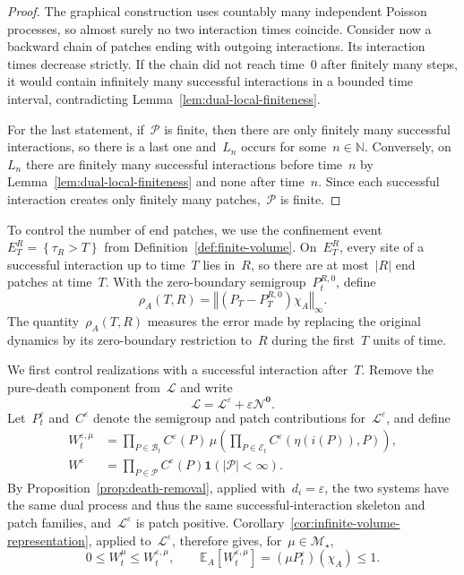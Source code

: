 \documentclass[EJP,preprint,NODS,nobera]{ejpecp}
\newcommand{\N}{\mathbb{N}}
\newcommand{\E}{\mathbb{E}}
\newcommand{\bb}[1]{\left(#1\right)}
\newcommand{\Cb}[1]{\left[#1\right]}
\newcommand{\cb}[1]{\left\{#1\right\}}
\newcommand{\norm}[1]{\left\Vert#1\right\Vert}
\newcommand{\abs}[1]{\left|#1\right|}
\newcommand{\ind}{\mathbf{1}}
\newcommand{\mb}[1]{\mathbf{#1}}
\newcommand{\Lcal}{\mathcal{L}}
\newcommand{\Ncal}{\mathcal{N}}
\newcommand{\chg}[1]{{\color{changegreen}#1}}
\begin{document}
\begin{proof}
The graphical construction uses countably many independent Poisson processes,
so almost surely no two interaction times coincide. Consider now a backward
chain of patches ending with outgoing interactions. Its interaction times
decrease strictly. If the chain did not reach time~$0$ after finitely many
steps, it would contain infinitely many successful interactions in a bounded
time interval, contradicting Lemma~\ref{lem:dual-local-finiteness}.

For the last statement, if~$\mathcal P$ is finite, then there are only
finitely many successful interactions, so there is a last one and~$L_n$ occurs
for some~$n\in\N$. Conversely, on~$L_n$ there are finitely many successful
interactions before time~$n$ by Lemma~\ref{lem:dual-local-finiteness} and none
after time~$n$. Since each successful interaction creates only finitely many
patches,~$\mathcal P$ is finite.
\end{proof}

\chg{To control the number of end patches, we use the confinement
event~$E_T^R=\cb{\tau_R>T}$ from Definition~\ref{def:finite-volume}. On~$E_T^R$,
every site of a successful interaction up to time~$T$ lies in~$R$, so there are
at most~$\abs R$ end patches at time~$T$. With the zero-boundary
semigroup~$P_t^{R,0}$, define}
\begin{equation}
\label{eq:confinement-error}
\rho_A(T,R)
=
\norm{\bb{P_T-P_T^{R,0}}\chi_A}_\infty.
\end{equation}
The quantity~$\rho_A(T,R)$ measures the error made by replacing the original
dynamics by its zero-boundary restriction to~$R$ during the first~$T$ units of
time.

We first control realizations with a successful interaction after~$T$. Remove
the pure-death component from~$\Lcal$ and write
\begin{equation}
\label{eq:uniform-death-decomposition}
\Lcal
=
\Lcal^\varepsilon
+
\varepsilon\Ncal^{\mb 0}.
\end{equation}
Let~$P_t^\varepsilon$ and~$C^\varepsilon$ denote the semigroup and patch
contributions for~$\Lcal^\varepsilon$, and define
\begin{align*}
W_t^{\varepsilon,\mu}
&=
\prod_{P\in\mathcal B_t}C^\varepsilon(P)\,
\mu\bb{
\prod_{P\in\mathcal E_t}
C^\varepsilon\bb{\eta\bb{i(P)},P}
},
\\
W^\varepsilon
&=
\prod_{P\in\mathcal P}C^\varepsilon(P)
\ind\bb{\abs{\mathcal P}<\infty}.
\end{align*}
By Proposition~\ref{prop:death-removal}, applied with~$d_i=\varepsilon$, the two systems have the
same dual process and thus the same successful-interaction skeleton and patch families\chg{,
and~$\Lcal^\varepsilon$ is patch positive. Corollary~\ref{cor:infinite-volume-representation},
applied to~$\Lcal^\varepsilon$, therefore gives}, for~$\mu\in\mathcal M_\star$,
\begin{equation}
\label{eq:death-removed-weight-comparison}
0\leq W_t^\mu\leq W_t^{\varepsilon,\mu},
\qquad
\E_A\Cb{W_t^{\varepsilon,\mu}}
=
(\mu P_t^\varepsilon)(\chi_A)
\leq1.
\end{equation}
\end{document}
